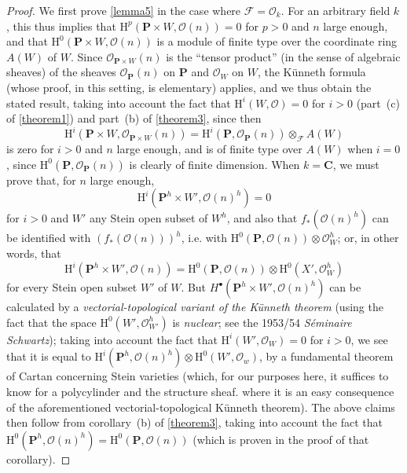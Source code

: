 \documentclass{article}
\theoremstyle{plain}
\theoremstyle{definition}
\newcommand{\sh}[1]{{\mathscr{#1}}}
\newcommand{\HH}{\mathrm{H}}
\newcommand{\oldpage}[1]{\marginpar{\footnotesize$\Big\vert$ \textit{p.~#1}}}
\begin{document}
\begin{proof}
  We first prove \cref{lemma5} in the case where $\sh{F}=\sh{O}_k$.
  For an arbitrary field $k$, this thus implies that $\HH^p(\mathbf{P}\times W,\sh{O}(n))=0$ for $p>0$ and $n$ large enough, and that $\HH^0(\mathbf{P}\times W,\sh{O}(n))$ is a module of finite type over the coordinate ring $A(W)$ of $W$.
  Since $\sh{O}_{\mathbf{P}\times W}(n)$ is the ``tensor product'' (in the sense of algebraic sheaves) of the sheaves $\sh{O}_\mathbf{P}(n)$ on $\mathbf{P}$ and $\sh{O}_W$ on $W$, the K\"{u}nneth formula (whose proof, in this setting, is elementary) applies, and we thus obtain the stated result, taking into account the fact that $\HH^i(W,\sh{O})=0$ for $i>0$ (part~(c) of \cref{theorem1}) and part~(b) of \cref{theorem3}, since then
  \[
    \HH^i(\mathbf{P}\times W,\sh{O}_{\mathbf{P}\times W}(n))
    = \HH^i(\mathbf{P},\sh{O}_\mathbf{P}(n))\otimes_\sh{F} A(W)
  \]
  is zero for $i>0$ and $n$ large enough, and is of finite type over $A(W)$ when $i=0$, since $\HH^0(\mathbf{P},\sh{O}_\mathbf{P}(n))$ is clearly of finite dimension.
  When $k=\mathbf{C}$, we must prove that, for $n$ large enough, \[\HH^i(\mathbf{P}^h\times W',\sh{O}(n)^h)=0\] for $i>0$ and $W'$ any Stein open subset of $W^h$, and also that $f_*(\sh{O}(n)^h)$ can be identified with $(f_*(\sh{O}(n)))^h$, i.e. with $\HH^0(\mathbf{P},\sh{O}(n))\otimes\sh{O}_W^h$;
  or, in other words, that
  \[
    \HH^i(\mathbf{P}^h\times W',\sh{O}(n))
    = \HH^0(\mathbf{P},\sh{O}(n))\otimes\HH^0(X',\sh{O}_W^h)
  \]
  for every Stein open subset $W'$ of $W$.
  But $H^\bullet(\mathbf{P}^h\times W',\sh{O}(n)^h)$ can be calculated by a \emph{vectorial-topological variant of the K\"{u}nneth theorem} (using the fact that the space
\oldpage{2-13}
  $\HH^0(W',\sh{O}_{W'}^h)$ is \emph{nuclear};
  see the 1953/54 \emph{S\'{e}minaire Schwartz});
  taking into account the fact that $\HH^i(W',\sh{O}_W)=0$ for $i>0$, we see that it is equal to $\HH^i(\mathbf{P}^h,\sh{O}(n)^h)\otimes\HH^0(W',\sh{O}_w)$, by a fundamental theorem of Cartan concerning Stein varieties (which, for our purposes here, it suffices to know for a polycylinder and the structure sheaf. where it is an easy consequence of the aforementioned vectorial-topological K\"{u}nneth theorem).
  The above claims then follow from corollary~(b) of \cref{theorem3}, taking into account the fact that $\HH^0(\mathbf{P}^h,\sh{O}(n)^h)=\HH^0(\mathbf{P},\sh{O}(n))$ (which is proven in the proof of that corollary).


\end{proof}
\end{document}
